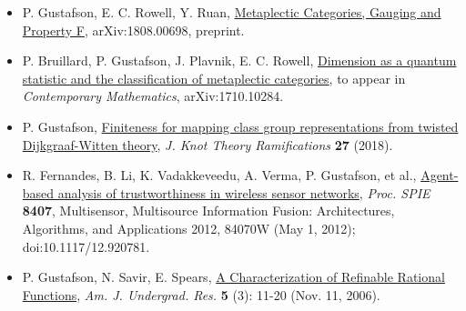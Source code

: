   \begin{itemize}

  \item[] P. Gustafson, E. C. Rowell, Y. Ruan, \href{https://arxiv.org/abs/1808.00698}{Metaplectic Categories, Gauging and Property F}, arXiv:1808.00698, preprint.

  \item[] P. Bruillard, P. Gustafson, J. Plavnik, E. C. Rowell, \href{https://arxiv.org/abs/1710.10284}{Dimension as a quantum statistic and the classification of metaplectic categories},  to appear in \emph{Contemporary Mathematics}, arXiv:1710.10284.
    
  \item[] P. Gustafson, \href{https://arxiv.org/abs/1610.06069}{Finiteness for mapping class group representations from twisted Dijkgraaf-Witten theory}, \emph{J. Knot Theory Ramifications} \textbf{27} (2018).

  \item[] R. Fernandes, B. Li, K. Vadakkeveedu, A. Verma, P. Gustafson, et al., \href{http://proceedings.spiedigitallibrary.org/proceeding.aspx?articleid=1354959}{Agent-based analysis of trustworthiness in wireless sensor networks}, \emph{Proc. SPIE} \textbf{8407}, Multisensor, Multisource Information Fusion: Architectures, Algorithms, and Applications 2012, 84070W (May 1, 2012); doi:10.1117/12.920781. 

 \item[] P. Gustafson, N. Savir, E. Spears, \href{http://www.uni.edu/ajur/v5n3/Gufstafson\%20et\%20al\%20new\%20pp\%2011-20.pdf}{A Characterization of Refinable Rational Functions}, \emph{Am. J. Undergrad. Res.} \textbf{5} (3): 11-20 (Nov. 11, 2006).
  
 \end{itemize}
 
